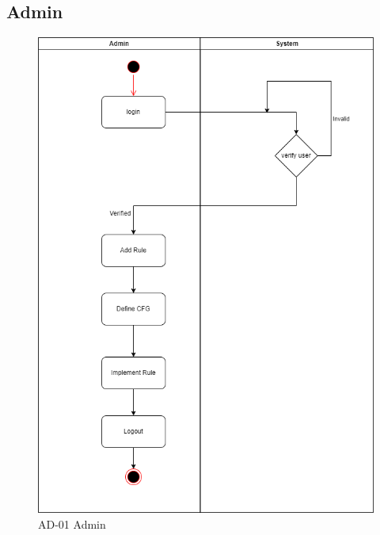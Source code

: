 \documentclass[12pt,a4paper]{article}
\begin{document}
\subsection{Admin}
\begin{figure}[hb]
 \centering
\includegraphics[scale=0.57]{Diagram/Admin_Activity_Diagram.png}
\caption{AD-01 Admin}
\end{figure}

\newpage
\end{document}
